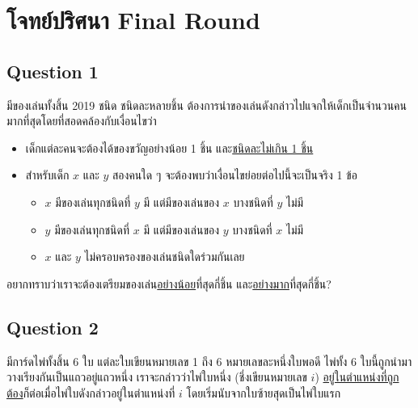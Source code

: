 \chapter{โจทย์ปริศนา Final Round}

\newpage
{}
\section{Question 1}

มีของเล่นทั้งสิ้น 2019 ชนิด ชนิดละหลายชิ้น ต้องการนำของเล่นดังกล่าวไปแจกให้เด็กเป็นจำนวนคนมากที่สุดโดยที่สอดคล้องกับเงื่อนไขว่า
\begin{itemize}[topsep=0pc,itemsep=0pc]
\item เด็กแต่ละคนจะต้องได้ของขวัญอย่างน้อย 1 ชิ้น และ\uline{ชนิดละไม่เกิน 1 ชิ้น}
\item สำหรับเด็ก $x$ และ $y$ สองคนใด ๆ จะต้องพบว่าเงื่อนไขย่อยต่อไปนี้จะเป็นจริง 1 ข้อ
    \begin{itemize}[topsep=0pc,itemsep=0pc]
        \item  $x$ มีของเล่นทุกชนิดที่ $y$ มี แต่มีของเล่นของ $x$ บางชนิดที่ $y$ ไม่มี
        \item  $y$ มีของเล่นทุกชนิดที่ $x$ มี แต่มีของเล่นของ $y$ บางชนิดที่ $x$ ไม่มี
        \item  $x$ และ $y$ ไม่ครอบครองของเล่นชนิดใดร่วมกันเลย
    \end{itemize}
\end{itemize}
อยากทราบว่าเราจะต้องเตรียมของเล่น\uline{อย่างน้อย}ที่สุดกี่ชิ้น และ\uline{อย่างมาก}ที่สุดกี่ชิ้น?


\section{Question 2}

มีการ์ดไพ่ทั้งสิ้น 6 ใบ แต่ละใบเขียนหมายเลข 1 ถึง 6 หมายเลขละหนึ่งใบพอดี \;
ไพ่ทั้ง 6 ใบนี้ถูกนำมาวางเรียงกันเป็นแถวอยู่แถวหนึ่ง \;
เราจะกล่าวว่าไพ่ใบหนึ่ง ({\hrsp}ชึ่งเขียนหมายเลข $i${\hrsp}) \uline{อยู่ในตำแหน่งที่ถูกต้อง}ก็ต่อเมื่อไพ่ใบดังกล่าวอยู่ในตำแหน่งที่ $i$ โดยเริ่มนับจากใบซ้ายสุดเป็นไพ่ใบแรก


